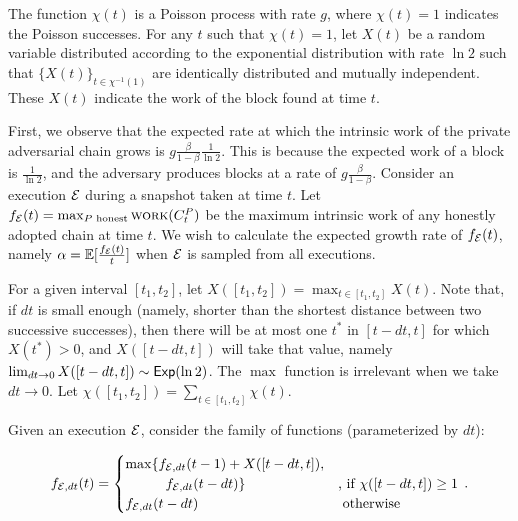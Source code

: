 The function $\chi(t)$ is a Poisson process with rate $g$, where $\chi(t) = 1$
indicates the Poisson successes. For any $t$ such that $\chi(t) = 1$, let $X(t)$ be a
random variable distributed according to the exponential distribution with rate $\ln2$
such that $\{ X(t) \}_{t \in \chi^{-1}(1)}$ are identically distributed and mutually
independent. These $X(t)$ indicate the work of the block found at time $t$.

First, we observe that the expected rate at which the intrinsic work of the private adversarial
chain grows is $g \frac{\beta}{1 - \beta} \frac{1}{\ln2}$. This is because the expected work of a
block is $\frac{1}{\ln2}$, and the adversary produces blocks at a rate of $g \frac{\beta}{1 - \beta}$.
Consider an execution $\mathcal{E}$ during a snapshot taken at time $t$. Let
$f_{\mathcal{E}}(t) = \max_{P \text{ honest}}{\textsc{work}(C^P_t)}$ be the maximum intrinsic work of any honestly
adopted chain at time $t$. We wish to calculate the expected growth rate of $f_{\mathcal{E}}(t)$, namely
$\alpha = \mathop{{}\mathbb{E}}[\frac{f_{\mathcal{E}}(t)}{t}]$ when $\mathcal{E}$ is sampled from all executions.

For a given interval $[t_1, t_2]$, let $X([t_1, t_2]) = \max_{t \in [t_1, t_2]} X(t)$. Note that, if
$dt$ is small enough (namely, shorter than the shortest distance between two successive successes),
then there will be at most one $t^*$ in $[t - dt, t]$ for which $X(t^*) > 0$, and $X([t - dt, t])$
will take that value, namely $\lim_{dt \to 0} X([t - dt, t]) \sim \textsf{Exp}(\ln2)$.
The $\max$ function is irrelevant when we take $dt \to 0$.
Let $\chi([t_1, t_2]) = \sum_{t \in [t_1, t_2]} \chi(t)$.

Given an execution $\mathcal{E}$, consider the family of functions (parameterized by $dt$):

\[
  f_{\Epsilon,dt}(t) = \begin{cases}
             \max\{f_{\Epsilon,dt}(t - 1) + X([t - dt, t]),&\\
    \phantom{\max\{\}}      f_{\Epsilon,dt}(t - dt)\} & \text{, if } \chi([t - dt, t]) \geq 1\\
          f_{\Epsilon,dt}(t - dt) & \text{ otherwise }
  \end{cases}\,.
\]

